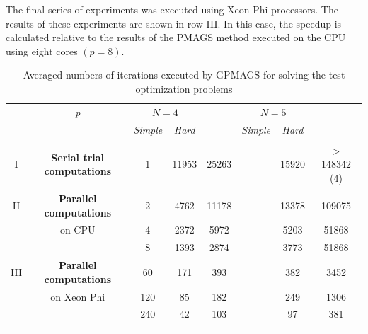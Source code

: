 \documentclass{aims}
\theoremstyle{definition}
\begin{document}
The final series of experiments was executed using Xeon Phi processors. The results
of these experiments are shown in row III. In this case, the speedup is
calculated relative to the results of the PMAGS method executed on the CPU using eight cores \((p=8)\).

\begin{table}
  \centering
  \caption{Averaged numbers of iterations executed by GPMAGS for solving the test optimization problems}
  \label{tab:4}
  \begin{tabular}{cccccccc}
    \cline{3-8}\noalign{\smallskip}
    \multicolumn{2}{c}{  } & \textit{p} & \multicolumn{2}{c}{$N=4$} & & \multicolumn{2}{c}{$N=5$}   \\
    \noalign{\smallskip} \cline{4-5} \cline{7-8}  \noalign{\smallskip}
    \multicolumn{2}{c}{  } & & \textit{Simple} & \textit{Hard} & & \textit{Simple} & \textit{Hard}  \\
    \noalign{\smallskip}\hline
    I &
    \parbox{0.25\textwidth}{
    \begin{center}
    \textbf{Serial trial computations}
    \end{center}		}
      & 1 & 11953 & 25263 & & 15920 & \(>\)148342 (4)  \\
    \hline \noalign{\smallskip}
II  & \textbf{Parallel computations}  %
  & 2 & 4762 & 11178 & & 13378 & 109075 \\
& on CPU & 4 & 2372 & 5972 & & 5203 & 51868 \\
&  & 8 & 1393 & 2874 & & 3773 & 51868 \\
    \noalign{\smallskip}\hline	\noalign{\smallskip}
III & \textbf{Parallel computations} %
  & 60  & 171 & 393 & & 382 & 3452  \\
& on Xeon Phi  & 120 & 85 & 182 & & 249 & 1306 \\
&  & 240 & 42 & 103 & & 97 & 381 \\

    \noalign{\smallskip}\hline
  \end{tabular}
\end{table}
\end{document}
